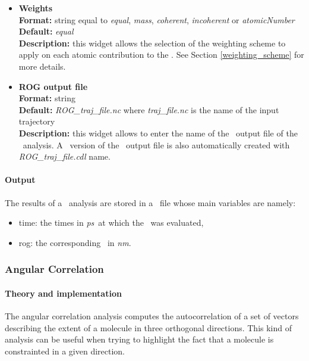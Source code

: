 \documentclass[a4paper,11pt]{report}
\newcommand{\nm}{\textit{nm}}
\newcommand{\ps}{\textit{ps}}
\begin{document}
\begin{itemize}
\hypertarget{rog_weights}{}
\item \textbf{Weights}\\
\textbf{Format:} string equal to \textit{equal}, \textit{mass}, \textit{coherent}, \textit{incoherent} or \textit{atomicNumber}\\
\textbf{Default:} \textit{equal}\\
\textbf{Description:} this widget allows the selection of the weighting scheme to apply on each atomic contribution 
to the \ROG. See Section \ref{weighting_scheme} for more details. 

\hypertarget{rog_rog_output_file}{}
\item \textbf{ROG output file}\\
\textbf{Format:} string\\
\textbf{Default:} \textit{ROG\_traj\_file.nc} where \textit{traj\_file.nc} is the name of the input trajectory\\
\textbf{Description:} this widget allows to enter the name of the \NetCDF\ output file of the \ROG\ analysis. A \CDL\ 
version of the \NetCDF\ output file is also automatically created with \textit{ROG\_traj\_file.cdl} name.
\end{itemize}

\paragraph{Output\\}
The results of a \ROG\ analysis are stored in a \NetCDF\ file whose main variables are namely:
\begin{itemize}
\item time: the times in \ps\ at which the \ROG\ was evaluated,
\item rog: the corresponding \ROG\ in \nm .
\end{itemize}

\subsubsection{Angular Correlation}
\label{ac}
\paragraph{Theory and implementation\\}
\label{ac_theory}
The angular correlation analysis computes the autocorrelation of a set of vectors describing the extent of a molecule in three 
orthogonal directions. This kind of analysis can be useful when trying to highlight the fact that a molecule is constrainted 
in a given direction.
\end{document}
